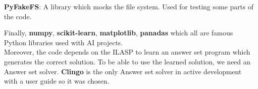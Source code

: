 \textbf{PyFakeFS}: A library which mocks the file system. Used for testing some parts of the code.

Finally, \textbf{numpy}, \textbf{scikit-learn}, \textbf{matplotlib}, \textbf{panadas} which all are famous Python libraries used with AI projects. \\


Moreover, the code depends on the ILASP to learn an answer set program which generates the correct solution.
To be able to use the learned solution, we need an Answer set solver.
\textbf{Clingo} is the only Answer set solver in active development with a user guide so it was chosen.


